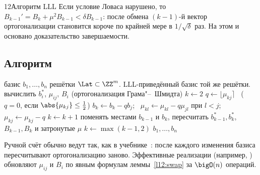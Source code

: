 \begin{lecture}{12}{Алгоритм LLL}
Если условие Ловаса нарушено, то $B_{k-1}' = B_k + \mu^2 B_{k-1} < \delta B_{k-1}$: после
обмена $(k-1)$-й вектор ортогонализации становится короче по крайней мере в
$1/\sqrt{\delta}$ раз. На этом и основано доказательство завершаемости.

\subsection{Алгоритм}

\begin{algorithm}[LLL, $\delta = \frac34$]\label{l12:lllalg}
\begin{algorithmic}[1]
\Require базис $b_1, \dots, b_n$ решётки $\Lat \subset \ZZ^m$.
\Ensure LLL-приведённый базис той же решётки.
\State вычислить $b_i^*$, $\mu_{ij}$, $B_i$ (ортогонализация Грама"--~Шмидта)
\State $k \gets 2$
   
    \State $q \gets \lfloor \mu_{kj} \rceil$ \ ($q = 0$, если $\abs{\mu_{kj}} \le \frac12$)
      \State $b_k \gets b_k - q b_j$; \ $\mu_{kl} \gets \mu_{kl} - q \mu_{jl}$ при $l < j$;
        \ $\mu_{kj} \gets \mu_{kj} - q$
    \EndIf
  \EndFor
   
    \State $k \gets k + 1$
  \Else
    \State поменять местами $b_{k-1}$ и $b_k$, пересчитать $b_{k-1}^*, b_k^*$, $B_{k-1}, B_k$
      и затронутые $\mu$
    \State $k \gets \max(k - 1, 2)$
  \EndIf
\EndWhile
\State \Return $b_1, \dots, b_n$
\end{algorithmic}
\end{algorithm}

Ручной счёт обычно ведут так, как в учебнике~\cite[разд.~7.13.2]{hps}: после каждого
изменения базиса пересчитывают ортогонализацию заново. Эффективные реализации (например,
\cite[алг.~2.6.3]{cohen}) обновляют $\mu_{ij}$ и $B_i$ по явным формулам
леммы~\ref{l12:swap} за $\bigO(n)$ операций.


\end{lecture}
